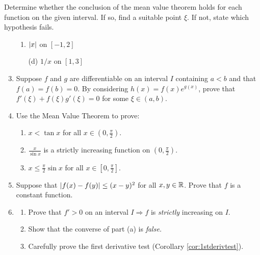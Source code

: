 

\begin{exercises}
	\exstart Determine whether the conclusion of the mean value theorem holds for each function on the given interval. If so, find a suitable point $\xi$. If not, state which hypothesis fails.
	\begin{enumerate}\setcounter{enumi}{1}\itemsep0pt
	  \item[]\begin{enumerate}
	    \item {}
	    \space{}
	    \space $\left| x\right|$ on $[-1,2]$
	    \item[(d)] 
	    \space $1/x$ on $[1,3]$
	  \end{enumerate}
	  
	  
	  \item Suppose $f$ and $g$ are differentiable on an interval $I$ containing $a<b$ and that $f(a)=f(b)=0$. By considering $h(x)=f(x)e^{g(x)}$, prove that $f'(\xi)+f(\xi)g'(\xi)=0$ for some $\xi\in (a,b)$.
	  
	  
	  \item Use the Mean Value Theorem to prove:\vspace{-5pt}
	  \begin{enumerate}
	    \item $x<\tan x$ for all $x\in(0,\frac\pi 2)$.
	    \item $\frac{x}{\sin x}$ is a strictly increasing function on $(0,\frac\pi 2)$.
	    \item $x\le\frac{\pi}2\sin x$ for all $x\in[0,\frac\pi 2]$.
	  \end{enumerate}
	  
	  
	  \item Suppose that $\left| f(x)-f(y)\right|\le (x-y)^2$ for all $x,y\in\mathbb{R}$. Prove that $f$ is a constant function.  
	  
		\item\begin{enumerate}
		  \item Prove that $f'>0$ on an interval $I\Longrightarrow f$ is \emph{strictly} increasing on $I$.
		  \item Show that the converse of part (a) is \emph{false.}
	  	\item Carefully prove the first derivative test (Corollary \ref{cor:1stderivtest}).
		\end{enumerate}
		

\end{enumerate}
\end{exercises}
